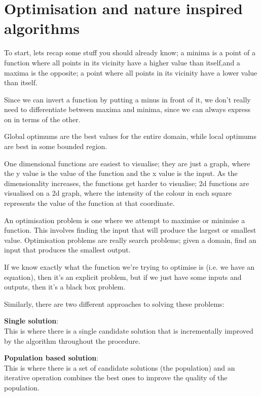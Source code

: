 \section{Optimisation and nature inspired algorithms}

To start, lets recap some stuff you should already know; a minima is a point of
a function where all points in its vicinity have a higher value than itself,and
a maxima is the opposite; a point where all points in its vicinity have a lower
value than itself.

Since we can invert a function by putting a minus in front of it, we don't
really need to differentiate between maxima and minima, since we can always
express on in terms of the other.

Global optimums are the best values for the entire domain, while local optimums
are best in some bounded region.

One dimensional functions are easiest to visualise; they are just a graph, where
the y value is the value of the function and the x value is the input. As the
dimensionality increases, the functions get harder to visualise; 2d functions
are visualised on a 2d graph, where the intensity of the colour in each square
represents the value of the function at that coordinate. 


An optimisation problem is one where we attempt to maximise or minimise a
function. This involves finding the input that will produce the largest or
smallest value. Optimisation problems are really search problems; given a
domain, find an input that produces the smallest output.

If we know exactly what the function we're trying to optimise is (i.e. we have
an equation), then it's an explicit problem, but if we just have some inputs and
outputs, then it's a black box problem.

Similarly, there are two different approaches to solving these problems:

\begin{description}
  \item \textbf{Single solution}:\\
   This is where there is a single candidate solution that is incrementally 
   improved by the algorithm throughout the procedure.
  \item \textbf{Population based solution}:\\
    This is where there is a set of candidate solutions (the population) and an
    iterative operation combines the best ones to improve the quality of the 
    population.
\end{description}


